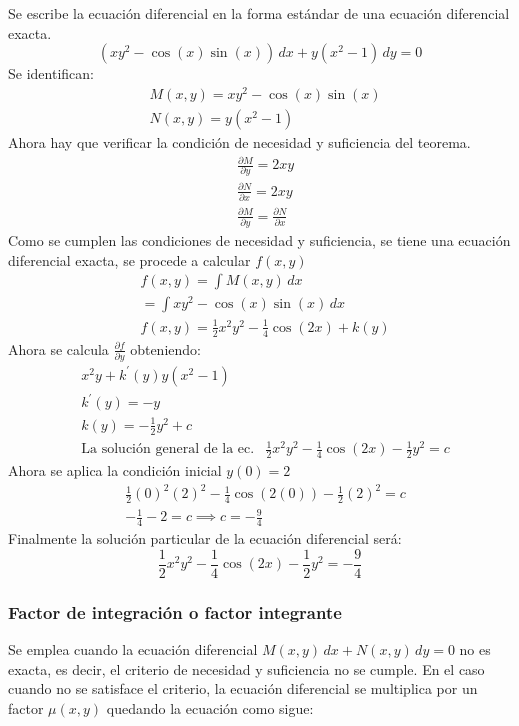 Se escribe la ecuación diferencial en la forma estándar de una ecuación diferencial exacta.
\begin{equation*}
    \left(xy^2-\cos{(x)}\sin{(x)}\right)\, dx+y\left(x^2-1\right)\, dy=0
\end{equation*}
Se identifican:
\begin{align*}
    &M(x,y)=xy^2-\cos{(x)}\sin{(x)}\\
    &N(x,y)=y\left(x^2-1\right)
\end{align*}
Ahora hay que verificar la condición de necesidad y suficiencia del teorema.
\begin{align*}
    &\frac{\partial M}{\partial y}=2xy\\
    &\frac{\partial N}{\partial x}=2xy\\
    &\frac{\partial M}{\partial y}=\frac{\partial N}{\partial x}
\end{align*}
Como se cumplen las condiciones de necesidad y suficiencia, se tiene una ecuación diferencial exacta, se procede a calcular $f(x,y)$
\begin{align*}
    &f(x,y)=\int M(x,y)\, dx\\
    &=\int xy^2-\cos{(x)}\sin{(x)}\, dx\\
    &f(x,y)=\frac{1}{2}x^2y^2-\frac{1}{4}\cos{(2x)}+k(y)
\end{align*}
Ahora se calcula $\frac{\partial f}{\partial y}$ obteniendo:
\begin{align*}
    &x^2y+k^{\prime}(y)y\left(x^2-1\right)\\
    &k^{\prime}(y)=-y\\
    &k(y)=-\frac{1}{2}y^2+c\\
    &\text{La solución general de la ec.}
    &\frac{1}{2}x^2y^2-\frac{1}{4}\cos{(2x)}-\frac{1}{2}y^2=c
\end{align*}
Ahora se aplica la condición inicial $y(0)=2$
\begin{align*}
    &\frac{1}{2}(0)^2(2)^2-\frac{1}{4}\cos{\left(2(0)\right)}-\frac{1}{2}(2)^2=c\\
    &-\frac{1}{4}-2=c\implies c=-\frac{9}{4}
\end{align*}
Finalmente la solución particular de la ecuación diferencial será:
\begin{equation*}
    \frac{1}{2}x^2y^2-\frac{1}{4}\cos{(2x)}-\frac{1}{2}y^2=-\frac{9}{4}
\end{equation*}

\subsubsection{Factor de integración o factor integrante}
Se emplea cuando la ecuación diferencial $M(x,y)\, dx+N(x,y)\, dy=0$ no es exacta, es decir,
el criterio de necesidad y suficiencia no se cumple.
En el caso cuando no se satisface el criterio, la ecuación diferencial se multiplica
por un factor $\mu (x,y)$ quedando la ecuación como sigue:

